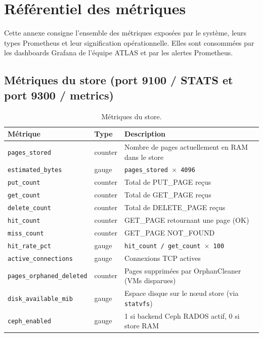 \chapter{Référentiel des métriques}
\label{annexe:metriques}

Cette annexe consigne l'ensemble des métriques exposées par le système, leurs types Prometheus et leur signification opérationnelle. Elles sont consommées par les dashboards Grafana de l'équipe ATLAS et par les alertes Prometheus.

\section{Métriques du store (port 9100 / STATS et port 9300 / metrics)}

\begin{table}[H]
\centering
\small
\begin{tabular}{p{4.2cm}lp{8cm}}
\toprule
\textbf{Métrique} & \textbf{Type} & \textbf{Description} \\
\midrule
\texttt{pages\_stored}            & counter & Nombre de pages actuellement en RAM dans le store \\
\texttt{estimated\_bytes}         & gauge   & \texttt{pages\_stored $\times$ 4096} \\
\texttt{put\_count}               & counter & Total de PUT\_PAGE reçus \\
\texttt{get\_count}               & counter & Total de GET\_PAGE reçus \\
\texttt{delete\_count}            & counter & Total de DELETE\_PAGE reçus \\
\texttt{hit\_count}               & counter & GET\_PAGE retournant une page (OK) \\
\texttt{miss\_count}              & counter & GET\_PAGE NOT\_FOUND \\
\texttt{hit\_rate\_pct}           & gauge   & \texttt{hit\_count / get\_count $\times$ 100} \\
\texttt{active\_connections}      & gauge   & Connexions TCP actives \\
\texttt{pages\_orphaned\_deleted} & counter & Pages supprimées par OrphanCleaner (VMs disparues) \\
\texttt{disk\_available\_mib}     & gauge   & Espace disque sur le nœud store (via \texttt{statvfs}) \\
\texttt{ceph\_enabled}            & gauge   & 1 si backend Ceph RADOS actif, 0 si store RAM \\
\bottomrule
\end{tabular}
\caption{Métriques du store.}
\end{table}

